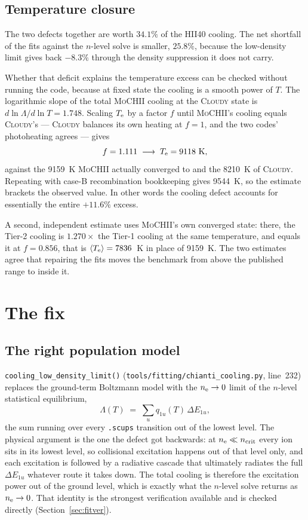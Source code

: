 \documentclass[english,a4paper]{my_memo}
\newcommand{\code}[1]{\texttt{#1}}
\newcommand{\MoCHII}{\textsc{MoCHII}}
\newcommand{\Cloudy}{\textsc{Cloudy}}
\newcommand{\Te}{T_{\rm e}}
\newcommand{\nel}{n_{\rm e}}
\newcommand{\ncrit}{n_{\rm crit}}
\begin{document}
\subsection{Temperature closure}

The two defects together are worth $34.1\%$ of the HII40 cooling.  The net
shortfall of the fits against the $n$-level solve is smaller, $25.8\%$,
because the low-density limit gives back $-8.3\%$ through the density
suppression it does not carry.

Whether that deficit explains the temperature excess can be checked without
running the code, because at fixed state the cooling is a smooth power of $T$.
The logarithmic slope of the total \MoCHII{} cooling at the \Cloudy{} state is
$d\ln\Lambda/d\ln T = 1.748$.  Scaling $\Te$ by a factor $f$ until \MoCHII{}'s
cooling equals \Cloudy{}'s --- \Cloudy{} balances its own heating at $f = 1$,
and the two codes' photoheating agrees --- gives
\[
  f = 1.111 \;\longrightarrow\; \Te = 9118~{\rm K},
\]
against the 9159~K \MoCHII{} actually converged to and the 8210~K of
\Cloudy{}.  Repeating with case-B recombination bookkeeping gives 9544~K, so
the estimate brackets the observed value.  In other words the cooling defect
accounts for essentially the entire $+11.6\%$ excess.

A second, independent estimate uses \MoCHII{}'s own converged state: there,
the Tier-2 cooling is $1.270\times$ the Tier-1 cooling at the same
temperature, and equals it at $f = 0.856$, that is $\langle \Te\rangle =
7836$~K in place of 9159~K.  The two estimates agree that repairing the fits
moves the benchmark from above the published range to inside it.

\section{The fix}
\label{sec:fix}

\subsection{The right population model}

\code{cooling\_low\_density\_limit()}
(\code{tools/fitting/chianti\_cooling.py}, line~232) replaces the ground-term
Boltzmann model with the $\nel \to 0$ limit of the $n$-level statistical
equilibrium,
\[
  \Lambda(T) \;=\; \sum_u q_{1u}(T)\,\Delta E_{1u},
\]
the sum running over every \code{.scups} transition out of the lowest level.
The physical argument is the one the defect got backwards: at
$\nel \ll \ncrit$ every ion sits in its lowest level, so collisional excitation
happens out of that level only, and each excitation is followed by a radiative
cascade that ultimately radiates the full $\Delta E_{1u}$ whatever route it
takes down.  The total cooling is therefore the excitation power out of the
ground level, which is exactly what the $n$-level solve returns as
$\nel \to 0$.  That identity is the strongest verification available and is
checked directly (Section~\ref{sec:fitver}).
\end{document}
